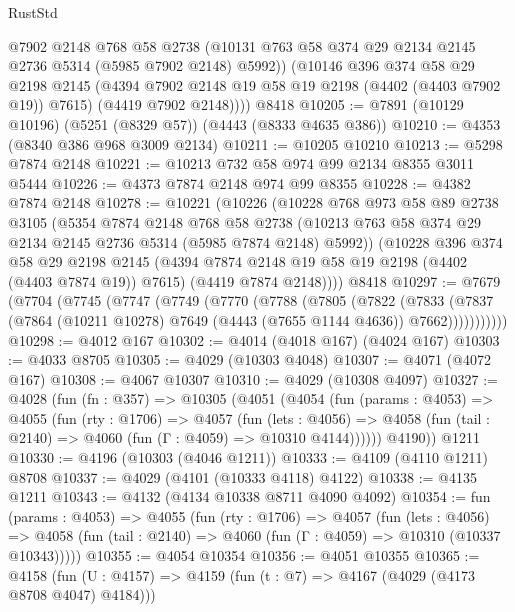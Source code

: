 \begin{lexlean}{RustStd}
\begin{coremodule}
          @7902
          @2148
          @768
          @58
          @2738
          (@10131 @763 @58 @374 @29 @2134 @2145 @2736 @5314 (@5985 @7902 @2148) @5992))
        (@10146
          @396
          @374
          @58
          @29
          @2198
          @2145
          (@4394 @7902 @2148 @19 @58 @19 @2198 (@4402 (@4403 @7902 @19)) @7615)
          (@4419 @7902 @2148))))
    @8418
@10205 := @7891 (@10129 @10196) (@5251 (@8329 @57)) (@4443 (@8333 @4635 @386))
@10210 := @4353 (@8340 @386 @968 @3009 @2134)
@10211 := @10205 @10210
@10213 := @5298 @7874 @2148
@10221 := @10213 @732 @58 @974 @99 @2134 @8355 @3011 @5444
@10226 := @4373 @7874 @2148 @974 @99 @8355
@10228 := @4382 @7874 @2148
@10278 := @10221
    (@10226
      (@10228
        @768
        @973
        @58
        @89
        @2738
        @3105
        (@5354
          @7874
          @2148
          @768
          @58
          @2738
          (@10213 @763 @58 @374 @29 @2134 @2145 @2736 @5314 (@5985 @7874 @2148) @5992))
        (@10228
          @396
          @374
          @58
          @29
          @2198
          @2145
          (@4394 @7874 @2148 @19 @58 @19 @2198 (@4402 (@4403 @7874 @19)) @7615)
          (@4419 @7874 @2148))))
    @8418
@10297 := @7679
    (@7704
      (@7745
        (@7747
          (@7749
            (@7770
              (@7788
                (@7805
                  (@7822
                    (@7833
                      (@7837
                        (@7864 (@10211 @10278) @7649 (@4443 (@7655 @1144 @4636)) @7662)))))))))))
@10298 := @4012 @167
@10302 := @4014 (@4018 @167) (@4024 @167)
@10303 := @4033 @8705
@10305 := @4029 (@10303 @4048)
@10307 := @4071 (@4072 @167)
@10308 := @4067 @10307
@10310 := @4029 (@10308 @4097)
@10327 := @4028
    (fun (fn : @357) =>
    @10305
      (@4051
        (@4054
          (fun (params : @4053) =>
          @4055
            (fun (rty : @1706) =>
            @4057
              (fun (lets : @4056) =>
              @4058 (fun (tail : @2140) => @4060 (fun (Γ : @4059) => @10310 @4144))))))
        @4190))
    @1211
@10330 := @4196 (@10303 (@4046 @1211))
@10333 := @4109 (@4110 @1211) @8708
@10337 := @4029 (@4101 (@10333 @4118) @4122)
@10338 := @4135 @1211
@10343 := @4132 (@4134 @10338 @8711 @4090 @4092)
@10354 := fun (params : @4053) =>
  @4055
    (fun (rty : @1706) =>
    @4057
      (fun (lets : @4056) =>
      @4058 (fun (tail : @2140) => @4060 (fun (Γ : @4059) => @10310 (@10337 @10343)))))
@10355 := @4054 @10354
@10356 := @4051 @10355
@10365 := @4158 (fun (U : @4157) => @4159 (fun (t : @7) => @4167 (@4029 (@4173 @8708 @4047) @4184)))

\end{coremodule}
\end{lexlean}
